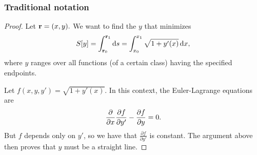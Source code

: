 \subsubsection{Traditional notation}
\begin{proof}
  Let $\mathbf{r} = (x, y). $ We want to find the $y$ that minimizes
\begin{align*}
  S[y] = \int_{\r_0}^{\r_1}\ds = \int_{x_0}^{x_1}\sqrt{1 + y'(x)} \dx,
\end{align*}
where $y$ ranges over all functions (of a certain class) having the specified endpoints.

Let $f(x, y, y') = \sqrt{1 + y'(x)}$. In this context, the Euler-Lagrange equations are
\begin{align*}
  \frac{\partial}{\partial x} \frac{\partial f}{\partial y'} - \frac{\partial f}{\partial y} = 0.
\end{align*}
But $f$ depends only on $y'$, so we have that $\frac{\partial f}{\partial y'} $ is constant. The argument above then proves that $y$ must be a straight line.
\end{proof}


